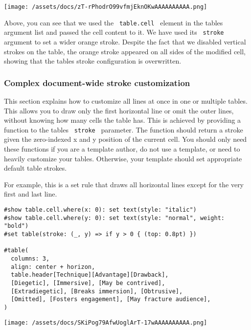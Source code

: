 \texttt{[image: /assets/docs/zT-rPhodrO99vfmjEknOKwAAAAAAAAAA.png]}

Above, you can see that we used the \texttt{\ table.cell\ } element in
the table\textquotesingle s argument list and passed the cell content to
it. We have used its \texttt{\ stroke\ } argument to set a wider orange
stroke. Despite the fact that we disabled vertical strokes on the table,
the orange stroke appeared on all sides of the modified cell, showing
that the table\textquotesingle s stroke configuration is overwritten.

\subsubsection{Complex document-wide stroke
customization}\label{stroke-functions}

This section explains how to customize all lines at once in one or
multiple tables. This allows you to draw only the first horizontal line
or omit the outer lines, without knowing how many cells the table has.
This is achieved by providing a function to the table\textquotesingle s
\texttt{\ stroke\ } parameter. The function should return a stroke given
the zero-indexed x and y position of the current cell. You should only
need these functions if you are a template author, do not use a
template, or need to heavily customize your tables. Otherwise, your
template should set appropriate default table strokes.

For example, this is a set rule that draws all horizontal lines except
for the very first and last line.

\begin{verbatim}
#show table.cell.where(x: 0): set text(style: "italic")
#show table.cell.where(y: 0): set text(style: "normal", weight: "bold")
#set table(stroke: (_, y) => if y > 0 { (top: 0.8pt) })

#table(
  columns: 3,
  align: center + horizon,
  table.header[Technique][Advantage][Drawback],
  [Diegetic], [Immersive], [May be contrived],
  [Extradiegetic], [Breaks immersion], [Obtrusive],
  [Omitted], [Fosters engagement], [May fracture audience],
)
\end{verbatim}

\texttt{[image: /assets/docs/SKiPog79AfwUoglArT-17wAAAAAAAAAA.png]}

